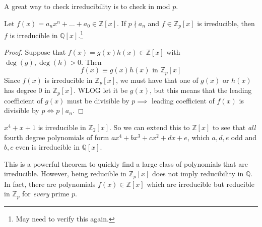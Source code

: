   A great way to check irreducibility is to check in mod $p$. 

  \begin{theorem}
    Let $f(x) = a_n x^n + \ldots + a_0 \in \mathbb{Z}[x]$. If $p \nmid a_n$ and $f \in \mathbb{Z}_p [x]$ is irreducible, then $f$ is irreducible in $\mathbb{Q}[x]$.\footnote{May need to verify this again.}
  \end{theorem}
  \begin{proof}
    Suppose that $f(x) = g(x) h(x) \in \mathbb{Z}[x]$ with $\deg(g), \deg(h) > 0$. Then 
    \begin{equation}
      f(x) \equiv g(x) h(x) \text{ in } \mathbb{Z}_p [x]
    \end{equation}
    Since $f(x)$ is irreducible in $\mathbb{Z}_p [x]$, we must have that one of $g(x)$ or $h(x)$ has degree $0$ in $\mathbb{Z}_p [x]$. WLOG let it be $g(x)$, but this means that the leading coefficient of $g(x)$ must be divisible by $p \implies$ leading coefficient of $f(x)$ is divisible by $p \iff p \mid a_n$. 
  \end{proof}

  \begin{example}
    $x^4 + x + 1$ is irreducible in $\mathbb{Z}_2 [x]$. So we can extend this to $\mathbb{Z}[x]$ to see that \textit{all} fourth degree polynomials of form $a x^4 + b x^3 + c x^2 + dx + e$, which $a, d, e$ odd and $b, c$ even is irreducible in $\mathbb{Q}[x]$. 
  \end{example}

  This is a powerful theorem to quickly find a large class of polynomials that are irreducible. However, being reducible in $\mathbb{Z}_p [x]$ does not imply reducibility in $\mathbb{Q}$. In fact, there are polynomials $f(x) \in \mathbb{Z}[x]$ which are irreducible but reducible in $\mathbb{Z}_p$ for \textit{every} prime $p$. 

